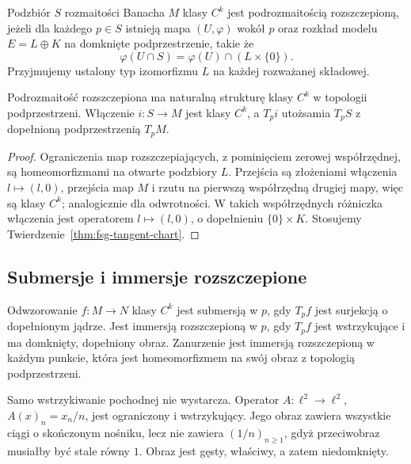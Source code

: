 \begin{definicja}
\label{def:fsg-split-submanifold}
Podzbiór $S$ rozmaitości Banacha $M$ klasy $C^k$
jest podrozmaitością rozszczepioną, jeżeli dla każdego $p\in S$
istnieją mapa $(U,\varphi)$ wokół $p$ oraz rozkład modelu
$E=L\oplus K$ na domknięte podprzestrzenie, takie że
\[
 \varphi(U\cap S)=\varphi(U)\cap (L\times\{0\}).
\]
Przyjmujemy ustalony typ izomorfizmu $L$ na każdej
rozważanej składowej.
\end{definicja}

\begin{stwierdzenie}
\label{prop:fsg-submanifold-tangent}
Podrozmaitość rozszczepiona ma naturalną strukturę klasy $C^k$
w topologii podprzestrzeni. Włączenie $i:S\to M$ jest
klasy $C^k$, a $T_pi$ utożsamia $T_pS$ z dopełnioną
podprzestrzenią $T_pM$.
\end{stwierdzenie}
\begin{proof}
Ograniczenia map rozszczepiających, z pominięciem zerowej
współrzędnej, są homeomorfizmami na otwarte podzbiory $L$.
Przejścia są złożeniami włączenia $l\mapsto(l,0)$,
przejścia map $M$ i rzutu na pierwszą współrzędną drugiej
mapy, więc są klasy $C^k$; analogicznie dla odwrotności.
W takich współrzędnych różniczka włączenia jest operatorem
$l\mapsto(l,0)$, o dopełnieniu $\{0\}\times K$.
Stosujemy Twierdzenie~\ref{thm:fsg-tangent-chart}.
\end{proof}

\subsection{Submersje i immersje rozszczepione}

\begin{definicja}
\label{def:fsg-split-maps}
Odwzorowanie $f:M\to N$ klasy $C^k$ jest submersją w $p$,
gdy $T_pf$ jest surjekcją o dopełnionym jądrze.
Jest immersją rozszczepioną w $p$, gdy $T_pf$ jest
wstrzykujące i ma domknięty, dopełniony obraz.
Zanurzenie jest immersją rozszczepioną w każdym punkcie,
która jest homeomorfizmem na swój obraz z topologią podprzestrzeni.
\end{definicja}
Samo wstrzykiwanie pochodnej nie wystarcza. Operator
$A:\ell^2\to\ell^2$, $A(x)_n=x_n/n$, jest ograniczony
i wstrzykujący. Jego obraz zawiera wszystkie ciągi o
skończonym nośniku, lecz nie zawiera $(1/n)_{n\ge1}$,
gdyż przeciwobraz musiałby być stale równy $1$.
Obraz jest gęsty, właściwy, a zatem niedomknięty.

